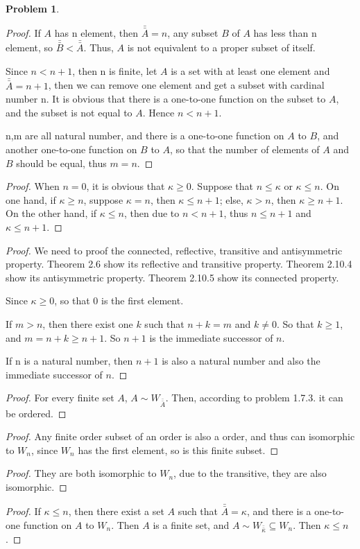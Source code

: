 \documentclass[a4paper,11pt]{article}%
\theoremstyle{remark}
\theoremstyle{definition}
\newtheorem{problem}{Problem}[subsection]
\begin{document}
\begin{problem}
\begin{proof}
    If $A$ has n element, then $\bar{\bar{A}}=n$, any subset $B$ of $A$ has less than n
    element, so $\bar{\bar{B}}<\bar{\bar{A}}$. Thus, $A$ is not equivalent to a proper subset of itself.

Since $n<n+1$, then n is finite, let $A$ is a set with at least one element and $\bar{\bar{A}}=n+1$,
then we can remove one element and get a subset with cardinal number n. It is obvious that there is 
a one-to-one function on the subset to $A$, and the subset is not equal to $A$. Hence $n<n+1.$

n,m are all natural number, and there is a one-to-one function on $A$ to $B$,
and another one-to-one function on $B$ to $A$, so that the number of elements of $A$ and $B$
should be equal, thus $m=n$.
\end{proof}
\begin{proof}
 When $n=0$, it is obvious that $\kappa\geq 0$.
 Suppose that $n\leq \kappa$ or $\kappa\leq n$.
On one hand, if $\kappa \geq n$, suppose $\kappa=n$, then $\kappa\leq n+1$;
else, $\kappa >n$, then $\kappa\geq n+1.$
On the other hand, if $\kappa\leq n$, then due to $n<n+1$, thus $n\leq n+1$ and $\kappa\leq n+1$.
\end{proof}
\begin{proof}
   We need to proof the connected, reflective, transitive and antisymmetric property.
   Theorem 2.6 show its reflective and transitive property. Theorem 2.10.4 show its antisymmetric property.
   Theorem 2.10.5 show its connected property.

   Since $\kappa\geq 0$, so that 0 is the first element.

   If $m> n$, then there exist one $k$ such that $n+k=m$ and $k\neq 0$.
   So that $k\geq 1$, and $m=n+k\geq n+1$. So $n+1$ is the immediate successor of $n$.

   If n is a natural number, then $n+1$ is also a natural number and also the immediate successor of $n$.
\end{proof}
\begin{proof}
   For every finite set $A$, $A\sim W_{\bar{\bar{A}}}$. Then, according to problem 1.7.3.
   it can be ordered.
\end{proof}
\begin{proof}
    Any finite order subset of an order is also a order, and thus can isomorphic to $W_n$,
    since $W_n$ has the first element, so is this finite subset.
\end{proof}
\begin{proof}
    They are both isomorphic to $W_n$, due to the transitive, they are also isomorphic.
\end{proof}
\begin{proof}
   If $\kappa\leq n$, then there exist a set $A$ such that $\bar{\bar{A}}=\kappa$,
   and there is a one-to-one function on $A$ to $W_n$. Then $A$ is a finite set, 
   and $A\sim W_{\bar{\bar{\kappa}}}\subseteq W_n$. Then $\kappa\leq n$. 
\end{proof}
\end{problem}
\end{document}
